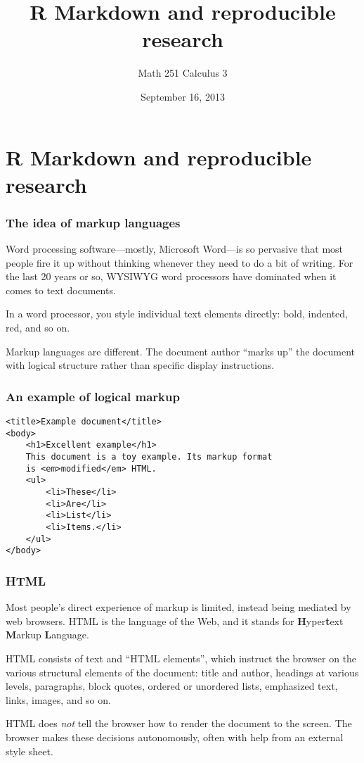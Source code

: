 \documentclass[11pt,ignorenonframetext,]{beamer}
\title{R Markdown and reproducible research}
\author{Math 251 Calculus 3}
\date{September 16, 2013 }
\begin{document}
\frame{\titlepage}

\section{R Markdown and reproducible research}

\begin{frame}\frametitle{The idea of markup languages}

Word processing software---mostly, Microsoft Word---is so pervasive that
most people fire it up without thinking whenever they need to do a bit
of writing. For the last 20 years or so, WYSIWYG word processors have
dominated when it comes to text documents.

In a word processor, you style individual text elements directly: bold,
indented, red, and so on.

Markup languages are different. The document author ``marks up'' the
document with logical structure rather than specific display
instructions.

\end{frame}

\begin{frame}[fragile]\frametitle{An example of logical markup}

\begin{verbatim}
<title>Example document</title>
<body>
    <h1>Excellent example</h1>
    This document is a toy example. Its markup format
    is <em>modified</em> HTML.
    <ul>
        <li>These</li>
        <li>Are</li>
        <li>List</li>
        <li>Items.</li>
    </ul>
</body>
\end{verbatim}

\end{frame}

\begin{frame}\frametitle{HTML}

Most people's direct experience of markup is limited, instead being
mediated by web browsers. HTML is the language of the Web, and it stands
for \textbf{H}yper\textbf{t}ext \textbf{M}arkup \textbf{L}anguage.

HTML consists of text and ``HTML elements'', which instruct the browser
on the various structural elements of the document: title and author,
headings at various levels, paragraphs, block quotes, ordered or
unordered lists, emphasized text, links, images, and so on.

HTML does \emph{not} tell the browser how to render the document to the
screen. The browser makes these decisions autonomously, often with help
from an external style sheet.

\end{frame}
\end{document}
